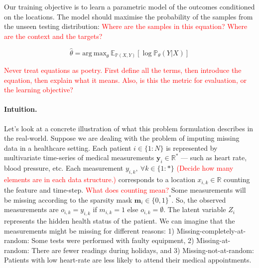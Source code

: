 \documentclass[a4paper,12pt,twoside,openright]{article}
\newcommand{\crit}[1]{\textcolor{red}{#1}}
\begin{document}
Our training objective is to learn a parametric model of the outcomes conditioned on the locations. The model should maximise the probability of the samples from the unseen testing distribution: \crit{Where are the samples in this equation? Where are the context and the targets?}

\begin{equation*}
    \hat{\theta} = \mathrm{arg~max}_{\theta} ~ \mathbb{E}_{\mathbb{P} (X, Y)} [\log \mathbb{P}_{\theta} (Y | X)]    
\end{equation*}

\crit{Never treat equations as poetry. First define all the terms, then introduce the equation, then explain what it means. Also, is this the metric for evaluation, or the learning objective?}

\paragraph{Intuition.} Let's look at a concrete illustration of what this problem formulation describes in the real-world. Suppose we are dealing with the problem of imputing missing data in a healthcare setting. Each patient $i \in \{1:N\}$ is represented by multivariate time-series of medical measurements $\mathbf{y}_i \in \mathbb{R}^{*}$ --- such as heart rate, blood pressure, etc. Each measurement $y_{i,k}, ~ \forall k \in \{1:*\}$ \crit{(Decide how many elements are in each data structure.)} corresponds to a location $x_{i,k} \in \mathbb{R}$ counting the feature and time-step. \crit{What does counting mean?} Some measurements will be missing according to the sparsity mask $\mathbf{m}_i \in \{0,1\}^*$. So, the observed measurements are $o_{i,k} = y_{i,k}$ if $m_{i,k} = 1$ else $o_{i,k} = \emptyset$.      
The latent variable $Z_i$ represents the hidden health status of the patient. We can imagine that the measurements might be missing for different reasons: 1) Missing-completely-at-random: Some tests were performed with faulty equipment, 2) Missing-at-random: There are fewer readings during holidays, and 3) Missing-not-at-random: Patients with low heart-rate are less likely to attend their medical appointments.
\end{document}
